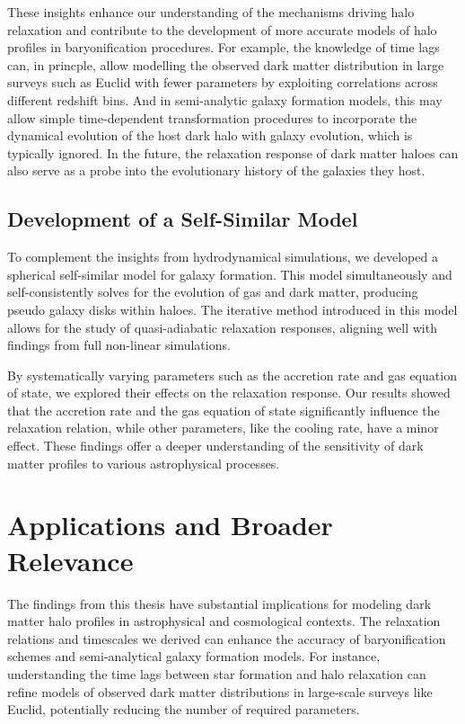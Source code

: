 These insights enhance our understanding of the mechanisms driving halo relaxation and contribute to the development of more accurate models of halo profiles in baryonification procedures. 
For example, the knowledge of time lags can, in princple, allow modelling the observed dark matter distribution in large surveys such as Euclid with fewer parameters by exploiting correlations across different redshift bins.
And in semi-analytic galaxy formation models, this %
may allow simple time-dependent transformation procedures to incorporate the dynamical evolution of the host dark halo with galaxy evolution, which is typically ignored. In the future, the relaxation response of dark matter haloes can also serve as a probe into the evolutionary history of the galaxies they host.

\subsection{Development of a Self-Similar Model}
To complement the insights from hydrodynamical simulations, we developed a spherical self-similar model for galaxy formation. This model simultaneously and self-consistently solves for the evolution of gas and dark matter, producing pseudo galaxy disks within haloes. The iterative method introduced in this model allows for the study of quasi-adiabatic relaxation responses, aligning well with findings from full non-linear simulations.

By systematically varying parameters such as the accretion rate and gas equation of state, we explored their effects on the relaxation response. Our results showed that the accretion rate and the gas equation of state significantly influence the relaxation relation, while other parameters, like the cooling rate, have a minor effect. These findings offer a deeper understanding of the sensitivity of dark matter profiles to various astrophysical processes.

\section{Applications and Broader Relevance}
The findings from this thesis have substantial implications for modeling dark matter halo profiles in astrophysical and cosmological contexts. The relaxation relations and timescales we derived can enhance the accuracy of baryonification schemes and semi-analytical galaxy formation models. For instance, understanding the time lags between star formation and halo relaxation can refine models of observed dark matter distributions in large-scale surveys like Euclid, potentially reducing the number of required parameters.

